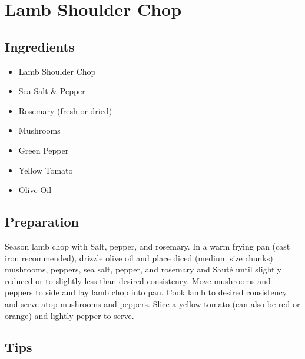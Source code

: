 \thispagestyle{fancy}
\section{Lamb Shoulder Chop}
\AddToShipoutPicture*{\LambShoulder}

\subsection*{Ingredients}
\begin{multicols}{3}
	\begin{itemize}
		\item Lamb Shoulder Chop
		\item Sea Salt \& Pepper
		\item Rosemary (fresh or dried)
		\item Mushrooms
		\item Green Pepper
		\item Yellow Tomato
		\item Olive Oil
	\end{itemize}
\end{multicols}

\subsection*{Preparation}

Season lamb chop with Salt, pepper, and rosemary. In a warm frying pan (cast iron recommended), drizzle olive oil and place diced (medium size chunks) mushrooms, peppers, sea salt, pepper, and rosemary and Saut\'{e} until slightly reduced or to slightly less than desired consistency. Move mushrooms and peppers to side and lay lamb chop into pan. Cook lamb to desired consistency and serve atop mushrooms and peppers. Slice a yellow tomato (can also be red or orange) and lightly pepper to serve.

\subsection*{Tips}
